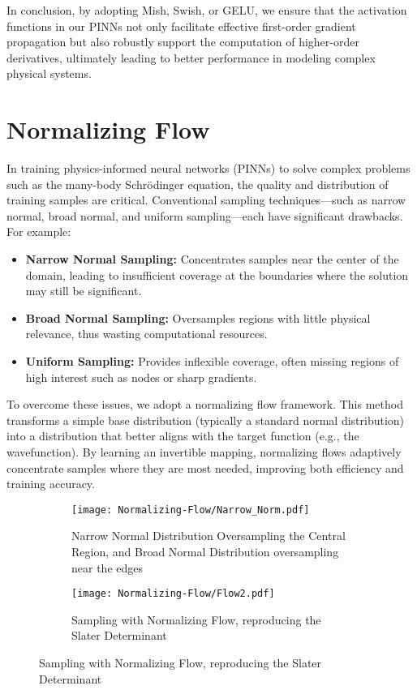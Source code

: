 In conclusion, by adopting Mish, Swish, or GELU, we ensure that the activation functions in our PINNs not only facilitate effective first-order gradient propagation but also robustly support the computation of higher-order derivatives, ultimately leading to better performance in modeling complex physical systems.


\section{Normalizing Flow}
In training physics-informed neural networks (PINNs) to solve complex problems such as the many-body Schrödinger equation, the quality and distribution of training samples are critical. Conventional sampling techniques—such as narrow normal, broad normal, and uniform sampling—each have significant drawbacks. For example:
\begin{itemize}
    \item \textbf{Narrow Normal Sampling:} Concentrates samples near the center of the domain, leading to insufficient coverage at the boundaries where the solution may still be significant.
    \item \textbf{Broad Normal Sampling:} Oversamples regions with little physical relevance, thus wasting computational resources.
    \item \textbf{Uniform Sampling:} Provides inflexible coverage, often missing regions of high interest such as nodes or sharp gradients.
\end{itemize}
To overcome these issues, we adopt a normalizing flow framework. This method transforms a simple base distribution (typically a standard normal distribution) into a distribution that better aligns with the target function (e.g., the wavefunction). By learning an invertible mapping, normalizing flows adaptively concentrate samples where they are most needed, improving both efficiency and training accuracy.

\begin{figure}[H]
    \centering
    \begin{subfigure}[t]{0.49\textwidth}
        \centering
        \texttt{[image: Normalizing-Flow/Narrow\_Norm.pdf]}
        \caption{Narrow Normal Distribution Oversampling the Central Region, and Broad Normal Distribution oversampling near the edges}
        \label{fig:Normal_sampling}
    \end{subfigure}
    \hfill
    \begin{subfigure}[t]{0.49\textwidth}
        \centering
        \texttt{[image: Normalizing-Flow/Flow2.pdf]}
        \caption{Sampling with Normalizing Flow, reproducing the Slater Determinant}
        \label{fig:Flow_sampling}
    \end{subfigure}
\end{figure}
